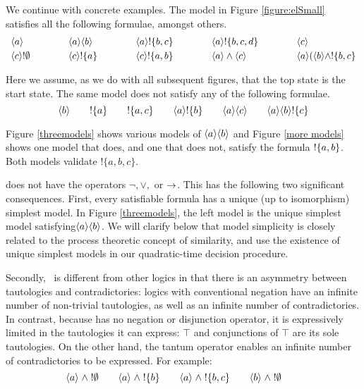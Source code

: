 

We continue with concrete examples.  The model in Figure
\ref{figure:elSmall} satisfies all the following formulae, amongst
others.
\[
\begin{array}{lclclclcl}
\MAY{a} &\qquad&
\MAY{a} \MAY{b} &\qquad&
\MAY{a} \fBang \{b,c\} &\qquad&
\MAY{a} \fBang \{b,c,d\} &\qquad&
\MAY{c} \\[1mm]
\MAY{c} \fBang \emptyset &&
\MAY{c} \fBang \{a\} &&
\MAY{c} \fBang \{a,b\} &&
\MAY{a} \land \MAY{c} &&
\MAY{a} (\MAY{b} \land \fBang \{b,c\}
\end{array}
\]

\NI Here we assume, as we do with all subsequent figures, that the top
state is the start state.  The same model does not satisfy any of the
following formulae.
\[
\langle b \rangle \qquad
! \{a\} \qquad
! \{a, c\} \qquad
\langle a \rangle ! \{b\} \qquad
\langle a \rangle \langle c \rangle \qquad
\langle a \rangle \langle b \rangle ! \{c\} 
\]

\NI Figure \ref{threemodels} shows various models of $\MAY{a} \MAY{b}$
and Figure \ref{more models} shows one model that does, and one that
does not, satisfy the formula $! \{a,b\}$.  Both models validate
$!\{a, b, c\}$.

\Cathoristic{} does not have the operators $\neg, \lor, $ or
$\rightarrow$.  This has the following two significant consequences.
First, every satisfiable formula has a unique (up to isomorphism)
simplest model.  In Figure \ref{threemodels}, the left model is the
unique simplest model satisfying$\MAY{a} \MAY{b}$.  We will clarify
below that model simplicity is closely related to the process
theoretic concept of similarity, and use the existence of unique
simplest models in our quadratic-time decision procedure.





Secondly, \cathoristic\  is different from other logics in that there is an
asymmetry between tautologies and contradictories: logics with
conventional negation have an infinite number of non-trivial
tautologies, as well as an infinite number of contradictories.  In
contrast, because \cathoristic{} has no negation or disjunction
operator, it is expressively limited in the tautologies it can
express: $\top$ and conjunctions of $\top$ are its sole tautologies. On the
other hand, the tantum operator enables an infinite number of
contradictories to be expressed.  For example:
\[
   \langle a \rangle \;\land\; ! \emptyset \qquad
   \langle a \rangle \;\land\; ! \{b\} \qquad
   \langle a \rangle \;\land\; ! \{b, c\} \qquad
   \langle b \rangle \;\land\; ! \emptyset \qquad
\]


